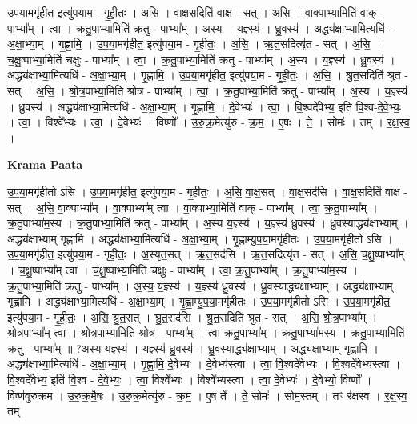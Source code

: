 \documentclass[17pt]{extarticle}
\begin{document}
उ॒प॒या॒मगृ॑हीत॒ इत्यु॑पया॒म - गृ॒ही॒तः॒ । अ॒सि॒ । वा॒क्ष॒सदिति॑ वाक्ष - सत् । अ॒सि॒ । वा॒क्पाभ्या॒मिति॑ वाक् - पाभ्या᳚म् । त्वा॒ । क्र॒तु॒पाभ्या॒मिति॑ क्रतु - पाभ्या᳚म् । अ॒स्य । य॒ज्ञ्स्य॑ । ध्रु॒वस्य॑ । अद्ध्य॑क्षाभ्या॒मित्यधि॑ - अ॒क्षा॒भ्या॒म् । गृ॒ह्णा॒मि॒ । उ॒प॒या॒मगृ॑हीत॒ इत्यु॑पया॒म - गृ॒ही॒तः॒ । अ॒सि॒ । ऋ॒त॒सदित्यृ॑त - सत् । अ॒सि॒ । च॒क्षु॒ष्पाभ्या॒मिति॑ चक्षुः - पाभ्या᳚म् । त्वा॒ । क्र॒तु॒पाभ्या॒मिति॑ क्रतु - पाभ्या᳚म् । अ॒स्य । य॒ज्ञ्स्य॑ । ध्रु॒वस्य॑ । अद्ध्य॑क्षाभ्या॒मित्यधि॑ - अ॒क्षा॒भ्या॒म् । गृ॒ह्णा॒मि॒ । उ॒प॒या॒मगृ॑हीत॒ इत्यु॑पया॒म - गृ॒ही॒तः॒ । अ॒सि॒ । श्रु॒त॒सदिति॑ श्रुत - सत् । अ॒सि॒ । श्रो॒त्र॒पाभ्या॒मिति॑ श्रोत्र - पाभ्या᳚म् । त्वा॒ । क्र॒तु॒पाभ्या॒मिति॑ क्रतु - पाभ्या᳚म् । अ॒स्य । य॒ज्ञ्स्य॑ । ध्रु॒वस्य॑ । अद्ध्य॑क्षाभ्या॒मित्यधि॑ - अ॒क्षा॒भ्या॒म् । गृ॒ह्णा॒मि॒ । दे॒वेभ्यः॑ । त्वा॒ । वि॒श्वदे॑वेभ्य॒ इति॑ वि॒श्व-दे॒वे॒भ्यः॒ । त्वा॒ । विश्वे᳚भ्यः । त्वा॒ । दे॒वेभ्यः॑ । विष्णो᳚ । उ॒रु॒क्र॒मेत्यु॑रु - क्र॒म॒ । ए॒षः । ते॒ । सोमः॑ । तम् । र॒क्ष॒स्व॒ ।  \newline


\textbf{Krama Paata} \newline

उ॒प॒या॒मगृ॑हीतो ऽसि । उ॒प॒या॒मगृ॑हीत॒ इत्यु॑पया॒म - गृ॒ही॒तः॒ । अ॒सि॒ वा॒क्ष॒सत् । वा॒क्ष॒सद॑सि । वा॒क्ष॒सदिति॑ वाक्ष - सत् । अ॒सि॒ वा॒क्पाभ्या᳚म् । वा॒क्पाभ्या᳚म् त्वा । वा॒क्पाभ्या॒मिति॑ वाक् - पाभ्या᳚म् । त्वा॒ क्र॒तु॒पाभ्या᳚म् । क्र॒तु॒पाभ्या॑म॒स्य । क्र॒तु॒पाभ्या॒मिति॑ क्रतु - पाभ्या᳚म् । अ॒स्य य॒ज्ञ्स्य॑ । य॒ज्ञ्स्य॑ ध्रु॒वस्य॑ । ध्रु॒वस्याद्ध्य॑क्षाभ्याम् । अद्ध्य॑क्षाभ्याम् गृह्णामि । अद्ध्य॑क्षाभ्या॒मित्यधि॑ - अ॒क्षा॒भ्या॒म् । गृ॒ह्णा॒म्यु॒प॒या॒मगृ॑हीतः । उ॒प॒या॒मगृ॑हीतो ऽसि । उ॒प॒या॒मगृ॑हीत॒ इत्यु॑पया॒म - गृ॒ही॒तः॒ । अ॒स्यृ॒त॒सत् । ऋ॒त॒सद॑सि । ऋ॒त॒सदित्यृ॑त - सत् । अ॒सि॒ च॒क्षु॒ष्पाभ्या᳚म् । च॒क्षु॒ष्पाभ्या᳚म् त्वा । च॒क्षु॒ष्पाभ्या॒मिति॑ चक्षुः - पाभ्या᳚म् । त्वा॒ क्र॒तु॒पाभ्या᳚म् । क्र॒तु॒पाभ्या॑म॒स्य । क्र॒तु॒पाभ्या॒मिति॑ क्रतु - पाभ्या᳚म् । अ॒स्य॒ य॒ज्ञ्स्य॑ । य॒ज्ञ्स्य॑ ध्रु॒वस्य॑ । ध्रु॒वस्याद्ध्य॑क्षाभ्याम् । अद्ध्य॑क्षाभ्याम् गृह्णामि । अद्ध्य॑क्षाभ्या॒मित्यधि॑ - अ॒क्षा॒भ्या॒म् । गृ॒ह्णा॒म्यु॒प॒या॒मगृ॑हीतः । उ॒प॒या॒मगृ॑हीतो ऽसि । उ॒प॒या॒मगृ॑हीत॒ इत्यु॑पया॒म - गृ॒ही॒तः॒ । अ॒सि॒ श्रु॒त॒सत् । श्रु॒त॒सद॑सि । श्रु॒त॒सदिति॑ श्रुत - सत् । अ॒सि॒ श्रो॒त्र॒पाभ्या᳚म् । श्रो॒त्र॒पाभ्या᳚म् त्वा । श्रो॒त्र॒पाभ्या॒मिति॑ श्रोत्र - पाभ्या᳚म् । त्वा॒ क्र॒तु॒पाभ्या᳚म् । क्र॒तु॒पाभ्या॑म॒स्य । क्र॒तु॒पाभ्या॒मिति॑ क्रतु - पाभ्या᳚म् ॥ ?अ॒स्य य॒ज्ञ्स्य॑ । य॒ज्ञ्स्य॑ ध्रु॒वस्य॑ । ध्रु॒वस्याद्ध्य॑क्षाभ्याम् । अद्ध्य॑क्षाभ्याम् गृह्णामि । अद्ध्य॑क्षाभ्या॒मित्यधि॑ - अ॒क्षा॒भ्या॒म् । गृ॒ह्णा॒मि॒ दे॒वेभ्यः॑ । दे॒वेभ्य॑स्त्वा । त्वा॒ वि॒श्वदे॑वेभ्यः । वि॒श्वदे॑वेभ्यस्त्वा । वि॒श्वदे॑वेभ्य॒ इति॑ वि॒श्व - दे॒वे॒भ्यः॒ । त्वा॒ विश्वे᳚भ्यः । विश्वे᳚भ्यस्त्वा । त्वा॒ दे॒वेभ्यः॑ । दे॒वेभ्यो॒ विष्णो᳚ । विष्ण॑वुरुक्रम । उ॒रु॒क्र॒मै॒षः । उ॒रु॒क्र॒मेत्यु॑रु - क्र॒म॒ । ए॒ष ते᳚ । ते॒ सोमः॑ । सोम॒स्तम् । तꣳ र॑क्षस्व । र॒क्ष॒स्व॒ तम् \newline
\end{document}
